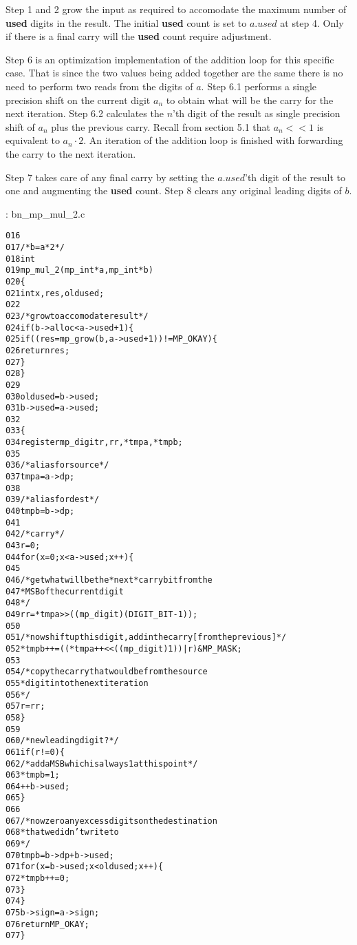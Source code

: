 \documentclass[b5paper]{book}
\begin{document}
Step 1 and 2 grow the input as required to accomodate the maximum number of \textbf{used} digits in the result.  The initial \textbf{used} count
is set to $a.used$ at step 4.  Only if there is a final carry will the \textbf{used} count require adjustment.

Step 6 is an optimization implementation of the addition loop for this specific case.  That is since the two values being added together 
are the same there is no need to perform two reads from the digits of $a$.  Step 6.1 performs a single precision shift on the current digit $a_n$ to
obtain what will be the carry for the next iteration.  Step 6.2 calculates the $n$'th digit of the result as single precision shift of $a_n$ plus
the previous carry.  Recall from section 5.1 that $a_n << 1$ is equivalent to $a_n \cdot 2$.  An iteration of the addition loop is finished with 
forwarding the carry to the next iteration.

Step 7 takes care of any final carry by setting the $a.used$'th digit of the result to one and augmenting the \textbf{used} count.  Step 8 clears
any original leading digits of $b$.

\vspace{+3mm}\begin{small}
\hspace{-5.1mm}{\bf File}: bn\_mp\_mul\_2.c
\vspace{-3mm}
\begin{alltt}
016   
017   /* b = a*2 */
018   int
019   mp_mul_2 (mp_int * a, mp_int * b)
020   \{
021     int     x, res, oldused;
022   
023     /* grow to accomodate result */
024     if (b->alloc < a->used + 1) \{
025       if ((res = mp_grow (b, a->used + 1)) != MP_OKAY) \{
026         return res;
027       \}
028     \}
029   
030     oldused = b->used;
031     b->used = a->used;
032   
033     \{
034       register mp_digit r, rr, *tmpa, *tmpb;
035   
036       /* alias for source */
037       tmpa = a->dp;
038       
039       /* alias for dest */
040       tmpb = b->dp;
041   
042       /* carry */
043       r = 0;
044       for (x = 0; x < a->used; x++) \{
045       
046         /* get what will be the *next* carry bit from the 
047          * MSB of the current digit 
048          */
049         rr = *tmpa >> ((mp_digit)(DIGIT_BIT - 1));
050         
051         /* now shift up this digit, add in the carry [from the previous] */
052         *tmpb++ = ((*tmpa++ << ((mp_digit)1)) | r) & MP_MASK;
053         
054         /* copy the carry that would be from the source 
055          * digit into the next iteration 
056          */
057         r = rr;
058       \}
059   
060       /* new leading digit? */
061       if (r != 0) \{
062         /* add a MSB which is always 1 at this point */
063         *tmpb = 1;
064         ++b->used;
065       \}
066   
067       /* now zero any excess digits on the destination 
068        * that we didn't write to 
069        */
070       tmpb = b->dp + b->used;
071       for (x = b->used; x < oldused; x++) \{
072         *tmpb++ = 0;
073       \}
074     \}
075     b->sign = a->sign;
076     return MP_OKAY;
077   \}
\end{alltt}
\end{small}
\end{document}

